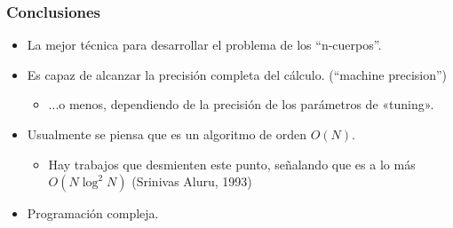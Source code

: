 \begin{frame}
    \frametitle{Conclusiones}
    
    \begin{itemize}
        \item La mejor técnica para desarrollar el problema de los ``n-cuerpos''.
        \item Es capaz de alcanzar la precisión completa del cálculo. (``machine precision'')
        \begin{itemize}
            \item ...o menos, dependiendo de la precisión de los parámetros de «tuning».
        \end{itemize}
        \item Usualmente se piensa que es un algoritmo de orden $O(N)$.
        \begin{itemize}
            \item Hay trabajos que desmienten este punto, señalando que es a lo más $O(N \log^{2} N)$ (Srinivas Aluru, 1993)
        \end{itemize}
        \item Programación compleja.
    \end{itemize}
\end{frame}
